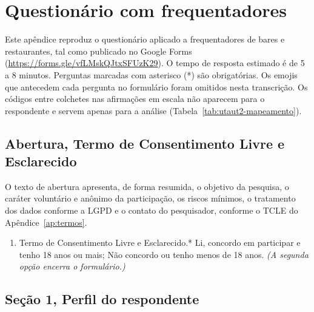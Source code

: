 \chapter{Questionário com frequentadores}
\label{ap:questionario}

Este apêndice reproduz o questionário aplicado a frequentadores de bares e restaurantes, tal como publicado no Google Forms (\url{https://forms.gle/vfLMskQJtxSFUzK29}). O tempo de resposta estimado é de 5 a 8 minutos. Perguntas marcadas com asterisco (*) são obrigatórias. Os emojis que antecedem cada pergunta no formulário foram omitidos nesta transcrição. Os códigos entre colchetes nas afirmações em escala não aparecem para o respondente e servem apenas para a análise (Tabela~\ref{tab:utaut2-mapeamento}).

\section*{Abertura, Termo de Consentimento Livre e Esclarecido}

O texto de abertura apresenta, de forma resumida, o objetivo da pesquisa, o caráter voluntário e anônimo da participação, os riscos mínimos, o tratamento dos dados conforme a LGPD e o contato do pesquisador, conforme o TCLE do Apêndice~\ref{ap:termos}.

\begin{enumerate}
	\item Termo de Consentimento Livre e Esclarecido.* Li, concordo em participar e tenho 18 anos ou mais; Não concordo ou tenho menos de 18 anos. \emph{(A segunda opção encerra o formulário.)}
\end{enumerate}

\section*{Seção 1, Perfil do respondente}

